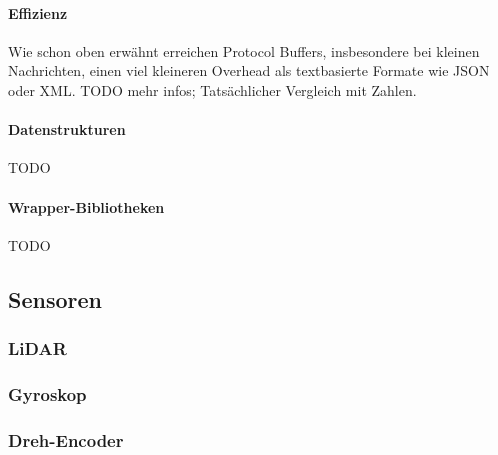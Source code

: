 \paragraph{Effizienz}
Wie schon oben erwähnt erreichen Protocol Buffers,
insbesondere bei kleinen Nachrichten,
einen viel kleineren Overhead als textbasierte Formate wie JSON oder XML.
%
TODO mehr infos; Tatsächlicher Vergleich mit Zahlen.


\paragraph{Datenstrukturen}
TODO

\paragraph{Wrapper-Bibliotheken}
TODO

\subsection{Sensoren}
\label{subsec:ueberblick_sensors}

\subsubsection{LiDAR}
\label{subsec:ueberblick_lidar}

\subsubsection{Gyroskop}
\label{subsec:ueberblick_gyro}

\subsubsection{Dreh-Encoder}
\label{subsec:ueberblick_rot_enc}